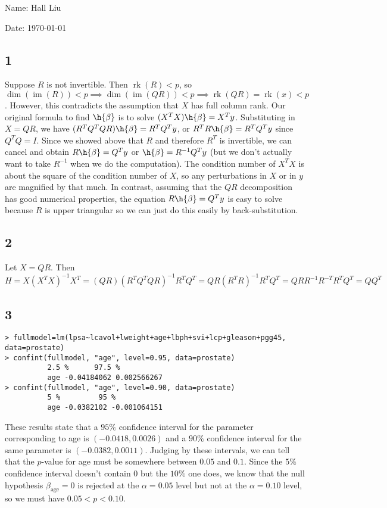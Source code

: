 \documentclass{article}
\DeclareMathOperator{\rk}{rk}
\DeclareMathOperator{\im}{im}
\begin{document}
Name: Hall Liu

Date: \today 
\vspace{1.5cm}

\subsection*{1}
Suppose $R$ is not invertible. Then $\rk(R)<p$, so $\dim(\im(R))<p\implies\dim(\im(QR))<p\implies\rk(QR)=\rk(x)<p$. However, this contradicts the assumption that $X$ has full column rank.
Our original formula to find $\h{\beta}$ is to solve $(X^TX)\h{\beta}=X^Ty$. Substituting in $X=QR$, we have $(R^TQ^TQR)\h{\beta}=R^TQ^Ty$, or $R^TR\h{\beta}=R^TQ^Ty$ since $Q^TQ=I$. Since we showed above that $R$ and therefore $R^T$ is invertible, we can cancel and obtain $R\h{\beta}=Q^Ty$ or $\h{\beta}=R^{-1}Q^Ty$ (but we don't actually want to take $R^{-1}$ when we do the computation).
The condition number of $X^TX$ is about the square of the condition number of $X$, so any perturbations in $X$ or in $y$ are magnified by that much. In contrast, assuming that the $QR$ decomposition has good numerical properties, the equation $R\h{\beta}=Q^Ty$ is easy to solve because $R$ is upper triangular so we can just do this easily by back-substitution. 
\subsection*{2}
Let $X=QR$. Then $H=X(X^TX)^{-1}X^T=(QR)(R^TQ^TQR)^{-1}R^TQ^T=QR(R^TR)^{-1}R^TQ^T=QRR^{-1}R^{-T}R^TQ^T=QQ^T$
\subsection*{3}
\begin{verbatim}
> fullmodel=lm(lpsa~lcavol+lweight+age+lbph+svi+lcp+gleason+pgg45, data=prostate)
> confint(fullmodel, "age", level=0.95, data=prostate)
          2.5 %      97.5 %
          age -0.04184062 0.002566267
> confint(fullmodel, "age", level=0.90, data=prostate)
          5 %         95 %
          age -0.0382102 -0.001064151
\end{verbatim}
These results state that a $95\%$ confidence interval for the parameter corresponding to age is $(-0.0418, 0.0026)$ and a $90\%$ confidence interval for the same parameter is $(-0.0382,0.0011)$. Judging by these intervals, we can tell that the $p$-value for age must be somewhere between $0.05$ and $0.1$. Since the $5\%$ confidence interval doesn't contain $0$ but the $10\%$ one does, we know that the null hypothesis $\beta_\text{age}=0$ is rejected at the $\alpha=0.05$ level but not at the $\alpha=0.10$ level, so we must have $0.05<p<0.10$.
\end{document}
